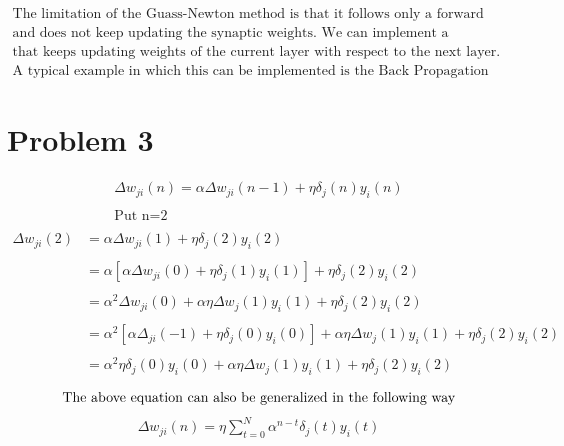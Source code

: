 \documentclass[12pt]{article}
\begin{document}
\begin{gather*}
  \text{The limitation of the Guass-Newton method is that it follows only a forward pass approach}\\
  \text{and does not keep updating the synaptic weights. We can implement a backward pass system}\\
  \text{that keeps updating weights of the current layer with respect to the next layer.}\\
  \text{A typical example in which this can be implemented is the Back Propagation Algorithm.}
\end{gather*}

\section*{Problem 3}
\begin{gather*}
    \Delta w_{ji}(n) = \alpha \Delta w_{ji}(n-1) + \eta\delta_j(n)y_i(n)\\\\
    \text{Put n=2}\\
\end{gather*}
\begin{align*}
    \Delta w_{ji}(2) &= \alpha \Delta w_{ji}(1) + \eta\delta_j(2)y_i(2)\\\\
    &=\alpha[\alpha\Delta w_{ji}(0)+\eta\delta_j(1)y_i(1)]+ \eta\delta_j(2)y_i(2)\\\\
    &=\alpha^2\Delta w_{ji}(0)+\alpha\eta\Delta w_j(1)y_i(1)+ \eta\delta_j(2)y_i(2)\\ \\
    &=\alpha^2[\alpha\Delta_{ji}(-1)+\eta\delta_j(0)y_i(0)]+\alpha\eta\Delta w_j(1)y_i(1)+ \eta\delta_j(2)y_i(2)\\ \\
    &=\alpha^2\eta\delta_j(0)y_i(0) +\alpha\eta\Delta w_j(1)y_i(1)+ \eta\delta_j(2)y_i(2)\\ 
\end{align*}
\[  
    \text{The above equation can also be generalized in the following way}\\
\]
\begin{gather*}
    \Delta w_{ji}(n) = \eta\sum_{t=0}^{N}\alpha^{n-t}\delta_j(t)y_i(t)
\end{gather*}
\end{document}
